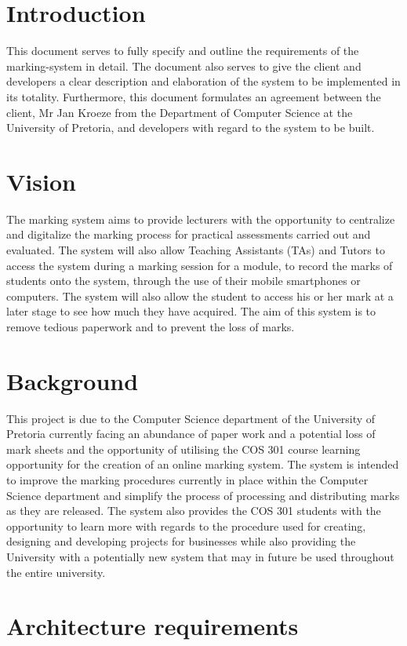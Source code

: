 \documentclass[12pt, a4paper]{scrartcl}
\begin{document}
		\thispagestyle{empty}
		\tableofcontents
		\newpage

		\setcounter{page}{1}
		\pagestyle{plain}
		\section{Introduction}
			This document serves to fully specify and 		outline the requirements of the marking-system in detail. The document also serves to give the client and developers a clear description and elaboration of the system to be implemented in its totality. Furthermore, this document formulates an agreement between the client, Mr Jan Kroeze from the Department of Computer Science at the University of Pretoria, and developers with regard to the system to be built.
		\section{Vision}
			The marking system aims to provide lecturers with the opportunity to centralize and digitalize the marking process for practical assessments carried out and evaluated. The system will also allow Teaching Assistants (TAs) and Tutors to access the system during a marking session for a module, to record the marks of students onto the system, through the use of their mobile smartphones or computers. The system will also allow the student to access his or her mark at a later stage to see how much they have acquired. The aim of this system is to remove tedious paperwork and to prevent the loss of marks.
		\section{Background}
			This project is due to the Computer Science department of the University of Pretoria currently facing an abundance of paper work and a potential loss of mark sheets and the opportunity of utilising the COS 301 course learning opportunity for the creation of an online marking system. The system is intended to improve the marking procedures currently in place within the Computer Science department and simplify the process of processing and distributing marks as they are released. The system also provides the COS 301 students with the opportunity to learn more with regards to the procedure used for creating, designing and developing projects for businesses while also providing the University with a potentially new system that may in future be used throughout the entire university.
		\pagebreak
		\section{Architecture requirements}
\end{document}
